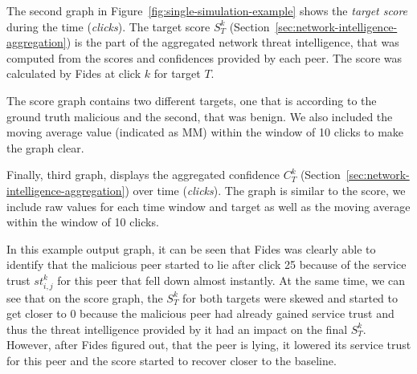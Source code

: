 The second graph in Figure~\ref{fig:single-simulation-example} shows the \textit{target score} during the time (\textit{clicks}).
The target score $S^{k}_{T}$ (Section~\ref{sec:network-intelligence-aggregation}) is the part of the aggregated network threat intelligence, that was computed from the scores and confidences provided by each peer.
The score was calculated by Fides at click $k$ for target $T$.

The score graph contains two different targets, one that is according to the ground truth malicious and the second, that was benign.
We also included the moving average value (indicated as MM) within the window of 10 clicks to make the graph clear.

Finally, third graph, displays the aggregated confidence $C^{k}_{T}$ (Section~\ref{sec:network-intelligence-aggregation}) over time (\textit{clicks}).
The graph is similar to the score, we include raw values for each time window and target as well as the moving average within the window of 10 clicks.

In this example output graph, it can be seen that Fides was clearly able to identify that the malicious peer started to lie after click 25 because of the service trust $st^{k}_{i,j}$ for this peer that fell down almost instantly.
At the same time, we can see that on the score graph, the $S^{k}_{T}$ for both targets were skewed and started to get closer to $0$ because the malicious peer had already gained service trust and thus the threat intelligence provided by it had an impact on the final $S^{k}_{T}$.
However, after Fides figured out, that the peer is lying, it lowered its service trust for this peer and the score started to recover closer to the baseline.